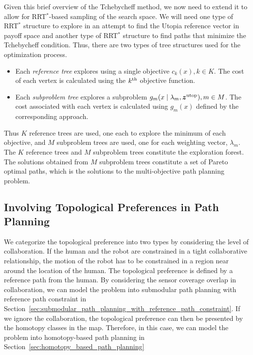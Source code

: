 \documentclass[phd]{byuprop}
\begin{document}
Given this brief overview of the Tchebycheff method, we now need to extend it to allow for RRT$^{*}$-based sampling of the search space.  
We will need one type of RRT$^{*}$ structure to explore in an attempt to find the Utopia reference vector in payoff space and another type of RRT$^{*}$ structure to find paths that minimize the Tchebycheff condition. %
Thus, there are two types of tree structures used for the optimization process.
\begin{itemize}
	\item Each \emph{reference tree} explores using a single objective $ c_{k} (x), k \in K $. 
	The cost of each vertex is calculated using the $ k^{\rm th} $ objective function.
	\item Each \emph{subproblem tree} explores a subproblem $ g_{m} ( x \mid \lambda_{m} , \bm{z}^{\rm utop} ) , m \in M $.
	The cost associated with each vertex is calculated using $ g_{m}(x) $ defined by the corresponding approach.
\end{itemize}
Thus $ K $ reference trees are used, one each to explore the minimum of each objective, and $ M $ subproblem trees are used, one for each weighting vector, $ \lambda_{m} $.  
The $K$ reference trees and $M$ subproblem trees constitute the exploration forest.
The solutions obtained from $ M $ subproblem trees constitute a set of Pareto optimal paths, which is the solutions to the multi-objective path planning problem. 


\subsection{Involving Topological Preferences in Path Planning}

We categorize the topological preference into two types by considering the level of collaboration.
If the human and the robot are constrained in a tight collaborative relationship, the motion of the robot has to be constrained in a region near around the location of the human.
The topological preference is defined by a reference path from the human.
By considering the sensor coverage overlap in collaboration, we can model the problem into submodular path planning with reference path constraint in Section~\ref{sec:submodular_path_planning_with_reference_path_constraint}.
If we ignore the collaboration, the topological preference can then be presented by the homotopy classes in the map.
Therefore, in this case, we can model the problem into homotopy-based path planning in Section~\ref{sec:homotopy_based_path_planning} 
\end{document}

